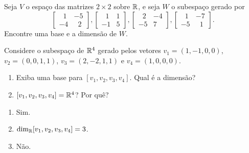 \documentclass[12pt]{exam}
\begin{document}
    \begin{exercicio}
        Seja $V$ o espaço das matrizes $2 \times 2$ sobre $\mathbb{R}$, e seja $W$ o subespaço gerado por
        \[
            \begin{bmatrix}
                \phantom{x} 1 & -5\\
                -4 & \phantom{x} 2
            \end{bmatrix},
            \begin{bmatrix}
                \phantom{x} 1 & 1\\
                -1 & 5
            \end{bmatrix},
            \begin{bmatrix}
                \phantom{x} 2 & -4\\
                -5 & 7
            \end{bmatrix},
            \begin{bmatrix}
                \phantom{x} 1 & -7\\
                -5 & \phantom{x} 1
            \end{bmatrix}.
        \]
        Encontre uma base e a dimensão de $W$.
    \end{exercicio}

    \begin{exercicio}
        Considere o subespaço de $\mathbb{R}^4$ gerado pelos vetores $v_1 = (1, -1, 0, 0)$, $v_2 = (0, 0, 1, 1)$, $v_3 = (2, -2, 1, 1)$ e $v_4 = (1, 0, 0, 0)$.
        \begin{enumerate}[label={\alph*})]
            \item Exiba uma base para $[v_1, v_2, v_3, v_4]$. Qual é a dimensão?

            \item $[v_1, v_2, v_3, v_4] = \mathbb{R}^4$? Por quê?
        \end{enumerate}
        \begin{solucao}
            \begin{enumerate}[label={\alph*})]
                \item Sim.

                \item $\dim_{\mathbb{R}} [v_1, v_2, v_3, v_4] = 3$.

                \item Não.
            \end{enumerate}
        \end{solucao}
    \end{exercicio}
\end{document}
